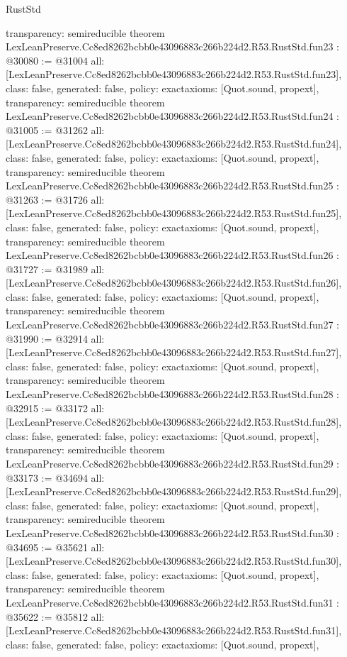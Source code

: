 \begin{lexlean}{RustStd}
\begin{coremodule}
{  transparency: semireducible
}
theorem LexLeanPreserve.Cc8ed8262bcbb0e43096883c266b224d2.R53.RustStd.fun23 : @30080 := @31004 {
  all: [LexLeanPreserve.Cc8ed8262bcbb0e43096883c266b224d2.R53.RustStd.fun23],
  class: false,
  generated: false,
  policy: exact{axioms: [Quot.sound, propext]},
  transparency: semireducible
}
theorem LexLeanPreserve.Cc8ed8262bcbb0e43096883c266b224d2.R53.RustStd.fun24 : @31005 := @31262 {
  all: [LexLeanPreserve.Cc8ed8262bcbb0e43096883c266b224d2.R53.RustStd.fun24],
  class: false,
  generated: false,
  policy: exact{axioms: [Quot.sound, propext]},
  transparency: semireducible
}
theorem LexLeanPreserve.Cc8ed8262bcbb0e43096883c266b224d2.R53.RustStd.fun25 : @31263 := @31726 {
  all: [LexLeanPreserve.Cc8ed8262bcbb0e43096883c266b224d2.R53.RustStd.fun25],
  class: false,
  generated: false,
  policy: exact{axioms: [Quot.sound, propext]},
  transparency: semireducible
}
theorem LexLeanPreserve.Cc8ed8262bcbb0e43096883c266b224d2.R53.RustStd.fun26 : @31727 := @31989 {
  all: [LexLeanPreserve.Cc8ed8262bcbb0e43096883c266b224d2.R53.RustStd.fun26],
  class: false,
  generated: false,
  policy: exact{axioms: [Quot.sound, propext]},
  transparency: semireducible
}
theorem LexLeanPreserve.Cc8ed8262bcbb0e43096883c266b224d2.R53.RustStd.fun27 : @31990 := @32914 {
  all: [LexLeanPreserve.Cc8ed8262bcbb0e43096883c266b224d2.R53.RustStd.fun27],
  class: false,
  generated: false,
  policy: exact{axioms: [Quot.sound, propext]},
  transparency: semireducible
}
theorem LexLeanPreserve.Cc8ed8262bcbb0e43096883c266b224d2.R53.RustStd.fun28 : @32915 := @33172 {
  all: [LexLeanPreserve.Cc8ed8262bcbb0e43096883c266b224d2.R53.RustStd.fun28],
  class: false,
  generated: false,
  policy: exact{axioms: [Quot.sound, propext]},
  transparency: semireducible
}
theorem LexLeanPreserve.Cc8ed8262bcbb0e43096883c266b224d2.R53.RustStd.fun29 : @33173 := @34694 {
  all: [LexLeanPreserve.Cc8ed8262bcbb0e43096883c266b224d2.R53.RustStd.fun29],
  class: false,
  generated: false,
  policy: exact{axioms: [Quot.sound, propext]},
  transparency: semireducible
}
theorem LexLeanPreserve.Cc8ed8262bcbb0e43096883c266b224d2.R53.RustStd.fun30 : @34695 := @35621 {
  all: [LexLeanPreserve.Cc8ed8262bcbb0e43096883c266b224d2.R53.RustStd.fun30],
  class: false,
  generated: false,
  policy: exact{axioms: [Quot.sound, propext]},
  transparency: semireducible
}
theorem LexLeanPreserve.Cc8ed8262bcbb0e43096883c266b224d2.R53.RustStd.fun31 : @35622 := @35812 {
  all: [LexLeanPreserve.Cc8ed8262bcbb0e43096883c266b224d2.R53.RustStd.fun31],
  class: false,
  generated: false,
  policy: exact{axioms: [Quot.sound, propext]},
}
\end{coremodule}
\end{lexlean}
